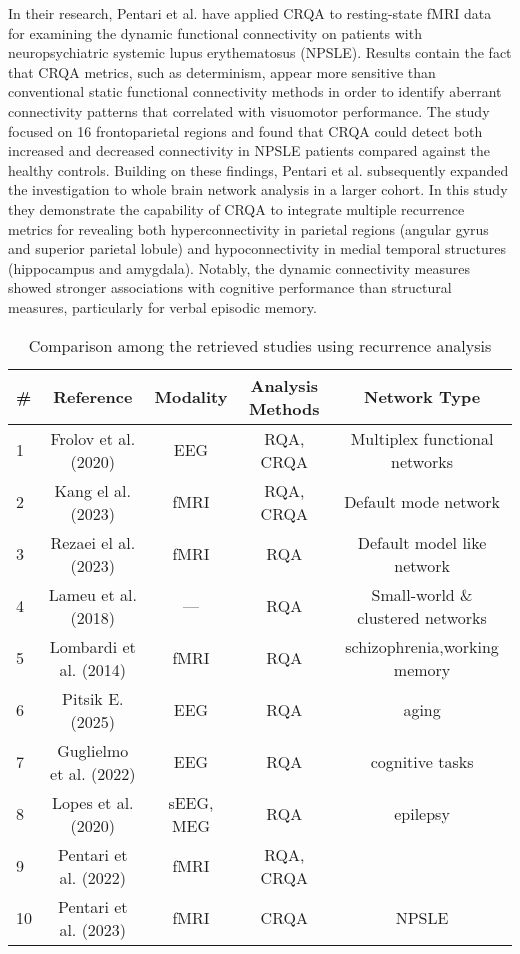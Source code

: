 \documentclass{article}
\begin{document}
In their research, Pentari et al.\cite{pentari22} have applied CRQA to resting-state fMRI data 
for examining the dynamic functional connectivity on patients with neuropsychiatric systemic 
lupus erythematosus (NPSLE). Results contain the fact that CRQA metrics, such as determinism,
appear more sensitive than conventional static functional connectivity methods in order to
identify aberrant connectivity patterns that correlated with visuomotor performance. 
The study focused on 16 frontoparietal regions and found that CRQA could detect 
both increased and decreased connectivity in NPSLE patients compared against the healthy controls. 
Building on these findings, Pentari et al.\cite{pentari23} subsequently expanded 
the investigation to whole brain network analysis in a larger cohort. 
In this study they demonstrate the capability of CRQA to integrate multiple recurrence metrics 
for revealing both hyperconnectivity in parietal regions (angular gyrus and superior parietal lobule) 
and hypoconnectivity in medial temporal structures (hippocampus and amygdala). 
Notably, the dynamic connectivity measures showed stronger associations with cognitive 
performance than structural measures, particularly for verbal episodic memory. 

\begin{table}[h]
\centering
\caption{Comparison among the retrieved studies using recurrence analysis}
\label{tab:comparison}
\begin{tabular}{@{}lcccc@{}}
\toprule
\# & Reference & Modality & Analysis Methods & Network Type \\
\midrule
1 & Frolov et al. (2020) & EEG & RQA, CRQA & Multiplex functional networks \\
2 & Kang el al. (2023) & fMRI & RQA, CRQA & Default mode network \\
3 & Rezaei el al. (2023) & fMRI & RQA & Default model like network \\
4 & Lameu et al. (2018) & --- & RQA & Small-world \& clustered networks \\
5 & Lombardi et al. (2014) & fMRI & RQA & schizophrenia,working memory \\
6 & Pitsik E. (2025) & EEG & RQA & aging \\
7 & Guglielmo et al. (2022) & EEG & RQA & cognitive tasks \\
8 & Lopes et al. (2020) & sEEG, MEG & RQA & epilepsy \\
9 & Pentari et al. (2022) & fMRI & RQA, CRQA &  \\
10 & Pentari et al. (2023) & fMRI & CRQA & NPSLE  \\

\bottomrule
\end{tabular}
\end{table}

\newpage


\end{document}
